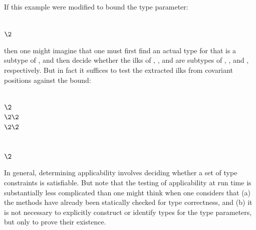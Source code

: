 If this example were modified to bound the type parameter:
\begin{codeexamplesize}
\begin{tabbing}
 \\
\(\2\)
\end{tabbing}
\end{codeexamplesize}
then one might imagine that one must first find an actual type  for  that is a subtype of ,
and then decide whether the ilks of , , and  are subtypes of , , and , respectively.
But in fact it suffices to test the extracted ilks from covariant positions against the bound:
\begin{codeexamplesize}
\begin{tabbing}
 \\
\(\2\) \\
\(\2\2\) \\
\(\2\2\)\EXP{\bigl(}\!\= \\
\>                       \\
\>                       \\
\(\2\)
\end{tabbing}
\end{codeexamplesize}

In general, determining applicability involves deciding whether a set of type constraints
is satisfiable.  But note that the testing of applicability at run time is substantially less complicated
than one might think when one considers that (a) the methods have already been statically
checked for type correctness, and (b) it is not necessary to explicitly construct or identify
types for the type parameters, but only to prove their existence.

